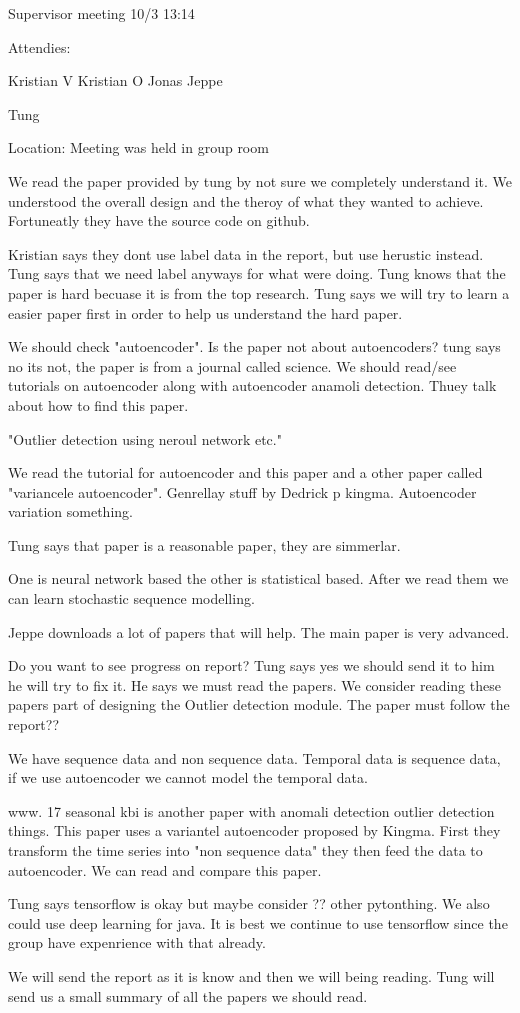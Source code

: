 Supervisor meeting 10/3 13:14

Attendies:

Kristian V
Kristian O
Jonas
Jeppe

Tung

Location: Meeting was held in group room

We read the paper provided by tung by not sure we completely understand it. We understood the overall design and the theroy of what they wanted to achieve.
Fortuneatly they have the source code on github.

Kristian says they dont use label data in the report, but use herustic instead.
Tung says that we need label anyways for what were doing. Tung knows that the paper is hard becuase it is from the top research. Tung says we will try to learn a easier paper first in order to help us understand the hard paper.

We should check "autoencoder". Is the paper not about autoencoders? tung says no its not, the paper is from a journal called science. We should read/see tutorials on autoencoder along with autoencoder anamoli detection. Thuey talk about how to find this paper. 

"Outlier detection using neroul network etc."

We read the tutorial for autoencoder and this paper and a other paper called "variancele autoencoder". Genrellay stuff by Dedrick p kingma.
Autoencoder variation something. 

Tung says that paper is a reasonable paper, they are simmerlar.

One is neural network based the other is statistical based. After we read them we can learn stochastic sequence modelling. 

Jeppe downloads a lot of papers that will help. The main paper is very advanced.

Do you want to see progress on report? Tung says yes we should send it to him he will try to fix it. He says we must read the papers. We consider reading these papers part of designing the Outlier detection module. The paper must follow the report??

We have sequence data and non sequence data. Temporal data is sequence data, if we use autoencoder we cannot model the temporal data. 

www. 17 seasonal kbi is another paper with anomali detection outlier detection things. This paper uses a variantel autoencoder proposed by Kingma.
First they transform the time series into "non sequence data" they then feed the data to autoencoder. We can read and compare this paper. 

Tung says tensorflow is okay but maybe consider ?? other pytonthing.
We also could use deep learning for java. It is best we continue to use tensorflow since the group have expenrience with that already.

We will send the report as it is know and then we will being reading. Tung will send us a small summary of all the papers we should read.